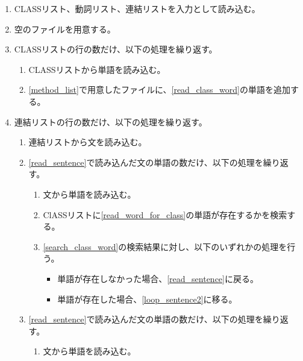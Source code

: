 \begin{enumerate}
    \item CLASSリスト、動詞リスト、連結リストを入力として読み込む。
    \item 空のファイルを用意する。
    \label{method_list}
    \item CLASSリストの行の数だけ、以下の処理を繰り返す。
        \begin{enumerate}
            \item CLASSリストから単語を読み込む。
            \label{read_class_word}
            \item \ref{method_list}で用意したファイルに、\ref{read_class_word}の単語を追加する。
        \end{enumerate}
    \item 連結リストの行の数だけ、以下の処理を繰り返す。
    \label{loop_connect_list}
        \begin{enumerate}
            \item 連結リストから文を読み込む。
            \label{read_sentence}
            \item \ref{read_sentence}で読み込んだ文の単語の数だけ、以下の処理を繰り返す。
            \label{loop_sentence}
                \begin{enumerate}
                    \item 文から単語を読み込む。
                    \label{read_word_for_class}
                    \item ClASSリストに\ref{read_word_for_class}の単語が存在するかを検索する。
                    \label{search_class_word}
                    \item \ref{search_class_word}の検索結果に対し、以下のいずれかの処理を行う。
                        \begin{itemize}
                            \item 単語が存在しなかった場合、\ref{read_sentence}に戻る。
                            \item 単語が存在した場合、\ref{loop_sentence2}に移る。
                        \end{itemize}
                \end{enumerate}
            \item \ref{read_sentence}で読み込んだ文の単語の数だけ、以下の処理を繰り返す。
            \label{loop_sentence2}
                \begin{enumerate}
                    \item 文から単語を読み込む。
                    \label{read_word_for_method}

\end{enumerate}
\end{enumerate}
\end{enumerate}
